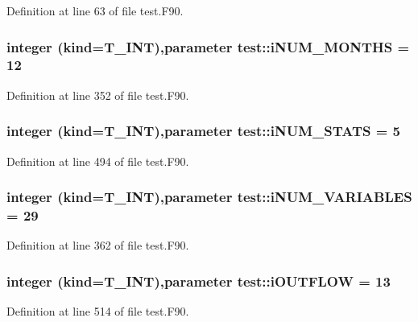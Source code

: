 Definition at line 63 of file test.F90.

\hypertarget{namespacetest_af0399520b5b36576c3c4e8305b487c65}{
\subsubsection[{iNUM\_\-MONTHS}]{\setlength{\rightskip}{0pt plus 5cm}integer (kind={\bf T\_\-INT}),parameter {\bf test::iNUM\_\-MONTHS} = 12}}
\label{namespacetest_af0399520b5b36576c3c4e8305b487c65}


Definition at line 352 of file test.F90.

\hypertarget{namespacetest_a2f5f426220fe1778999fe65b3c4def48}{
\subsubsection[{iNUM\_\-STATS}]{\setlength{\rightskip}{0pt plus 5cm}integer (kind={\bf T\_\-INT}),parameter {\bf test::iNUM\_\-STATS} = 5}}
\label{namespacetest_a2f5f426220fe1778999fe65b3c4def48}


Definition at line 494 of file test.F90.

\hypertarget{namespacetest_ae9174c7998b12348b71aa854ca83add7}{
\subsubsection[{iNUM\_\-VARIABLES}]{\setlength{\rightskip}{0pt plus 5cm}integer (kind={\bf T\_\-INT}),parameter {\bf test::iNUM\_\-VARIABLES} = 29}}
\label{namespacetest_ae9174c7998b12348b71aa854ca83add7}


Definition at line 362 of file test.F90.

\hypertarget{namespacetest_af391688ace32e5cfa1f0e6edf6499758}{
\subsubsection[{iOUTFLOW}]{\setlength{\rightskip}{0pt plus 5cm}integer (kind={\bf T\_\-INT}),parameter {\bf test::iOUTFLOW} = 13}}
\label{namespacetest_af391688ace32e5cfa1f0e6edf6499758}


Definition at line 514 of file test.F90.

